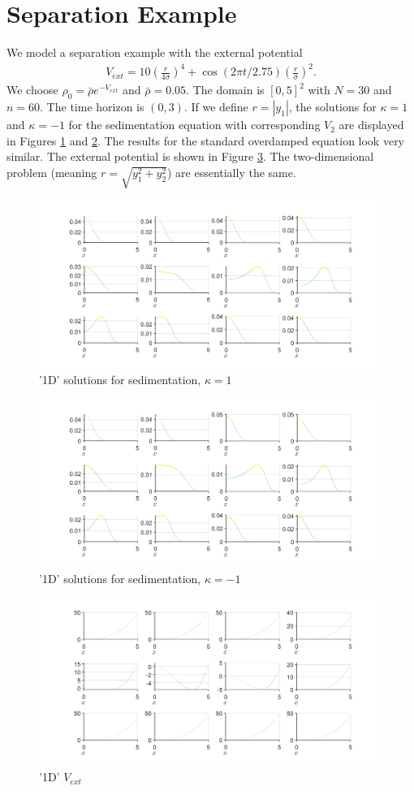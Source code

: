 \documentclass[11pt, a4paper]{article}
\theoremstyle{definition}
\begin{document}
	\section{Separation Example}
	We model a separation example with the external potential
	\begin{align*}
		V_{ext} = 10 \left(\frac{r}{4 \sigma}\right)^4 + \cos(2 \pi t / 2.75) \left(\frac{r}{\sigma}\right)^2.
	\end{align*}
	We choose $\rho_0 = \bar \rho e^{-V_{ext}}$ and $\bar \rho = 0.05$. The domain is $[0,5]^2$ with $N = 30$ and $n = 60$. The time horizon is $(0,3)$. If we define $r = |y_1|$, the solutions for $\kappa = 1$ and $\kappa = -1$ for the sedimentation equation with corresponding $V_2$ are displayed in Figures \ref{F1} and \ref{F1a}. The results for the standard overdamped equation look very similar. The external potential is shown in Figure \ref{F1b}. The two-dimensional problem (meaning $r = \sqrt{y_1^2 + y_2^2}$) are essentially the same.
	\begin{figure}[h]
		\centering
		\includegraphics[scale=0.35]{Exkappa1.png}
		\caption{'1D' solutions for sedimentation, $\kappa = 1$} 
		\label{F1}
	\end{figure}
	\begin{figure}[h]
		\centering
		\includegraphics[scale=0.35]{Exkappan1.png}
		\caption{'1D' solutions for sedimentation, $\kappa = - 1$} 
		\label{F1a}
	\end{figure}
	\begin{figure}[h]
		\centering
		\includegraphics[scale=0.35]{Vext.png}
		\caption{'1D' $V_{ext}$} 
		\label{F1b}
	\end{figure}
	
\end{document}
